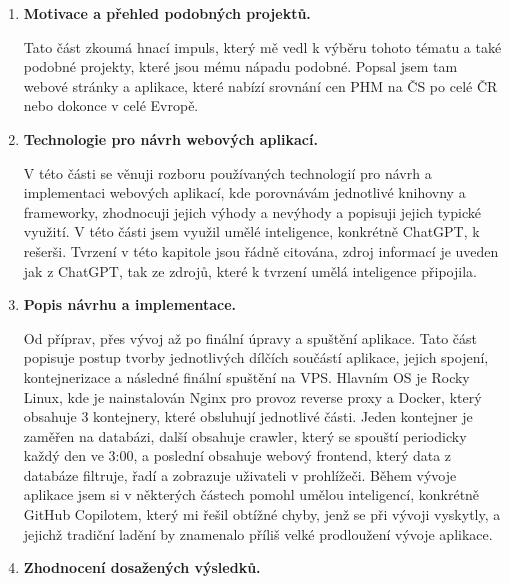 \begin{enumerate}
    \item \textbf{Motivace a přehled podobných projektů.}
        
        Tato část zkoumá hnací impuls, který mě vedl k výběru tohoto
        tématu a také podobné projekty, které jsou mému nápadu podobné.
        Popsal jsem tam webové stránky a aplikace, které nabízí srovnání
        cen PHM na ČS po celé ČR nebo dokonce v celé Evropě.

    \item \textbf{Technologie pro návrh webových aplikací.}

        V této části se věnuji rozboru používaných technologií
        pro návrh a implementaci webových aplikací, kde porovnávám
        jednotlivé knihovny a frameworky, zhodnocuji jejich
        výhody a nevýhody a popisuji jejich typické využití.
        V této části jsem využil umělé inteligence, konkrétně
        ChatGPT, k rešerši. Tvrzení v této kapitole jsou řádně
        citována, zdroj informací je uveden jak z ChatGPT, tak
        ze zdrojů, které k tvrzení umělá inteligence připojila.

    \item \textbf{Popis návrhu a implementace.}

        Od příprav, přes vývoj až po finální úpravy a spuštění aplikace.
        Tato část popisuje postup tvorby jednotlivých dílčích součástí
        aplikace, jejich spojení, kontejnerizace a následné finální
        spuštění na VPS. Hlavním OS je Rocky Linux, kde je nainstalován
        Nginx pro provoz reverse proxy a Docker, který obsahuje 3 kontejnery,
        které obsluhují jednotlivé části. Jeden kontejner je zaměřen
        na databázi, další obsahuje crawler, který se spouští periodicky
        každý den ve 3:00, a poslední obsahuje webový frontend, který data
        z databáze filtruje, řadí a zobrazuje uživateli v prohlížeči.
        Během vývoje aplikace jsem si v některých částech pomohl umělou
        inteligencí, konkrétně GitHub Copilotem, který mi řešil obtížné
        chyby, jenž se při vývoji vyskytly, a jejichž tradiční ladění
        by znamenalo příliš velké prodloužení vývoje aplikace.

    \item \textbf{Zhodnocení dosažených výsledků.}


\end{enumerate}
